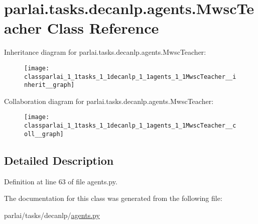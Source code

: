 \hypertarget{classparlai_1_1tasks_1_1decanlp_1_1agents_1_1MwscTeacher}{}\section{parlai.\+tasks.\+decanlp.\+agents.\+Mwsc\+Teacher Class Reference}
\label{classparlai_1_1tasks_1_1decanlp_1_1agents_1_1MwscTeacher}


Inheritance diagram for parlai.\+tasks.\+decanlp.\+agents.\+Mwsc\+Teacher\+:
\nopagebreak
\begin{figure}[H]
\begin{center}
\leavevmode
\texttt{[image: classparlai\_1\_1tasks\_1\_1decanlp\_1\_1agents\_1\_1MwscTeacher\_\_inherit\_\_graph]}
\end{center}
\end{figure}


Collaboration diagram for parlai.\+tasks.\+decanlp.\+agents.\+Mwsc\+Teacher\+:
\nopagebreak
\begin{figure}[H]
\begin{center}
\leavevmode
\texttt{[image: classparlai\_1\_1tasks\_1\_1decanlp\_1\_1agents\_1\_1MwscTeacher\_\_coll\_\_graph]}
\end{center}
\end{figure}


\subsection{Detailed Description}


Definition at line 63 of file agents.\+py.



The documentation for this class was generated from the following file\+:\begin{DoxyCompactItemize}
\item 
parlai/tasks/decanlp/\hyperlink{parlai_2tasks_2decanlp_2agents_8py}{agents.\+py}\end{DoxyCompactItemize}
